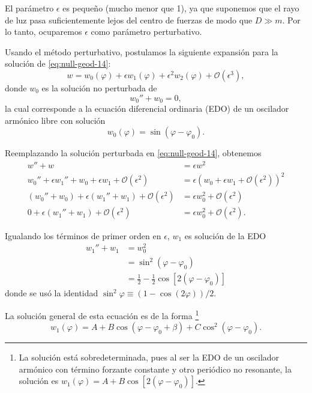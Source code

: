 \documentclass[letterpaper,11pt]{article}
\begin{document}
El parámetro $\epsilon$ es pequeño (mucho menor que 1), ya que suponemos que el rayo de luz pasa suficientemente lejos del centro de fuerzas  de modo que $D \gg m$. Por lo tanto, ocuparemos $\epsilon$ como parámetro perturbativo. 

Usando el método perturbativo, postulamos la siguiente expansión para la solución de \eqref{eq:null-geod-14}:
\begin{equation}
w = w_0(\varphi) + \epsilon w_1(\varphi) + \epsilon^2 w_2(\varphi) + \mathcal{O}(\epsilon^3),
\end{equation}
donde $w_0$ es la solución no perturbada de
\begin{equation}
w_0'' + w_0 = 0,
\end{equation}
la cual corresponde a la ecuación diferencial ordinaria (EDO) de un oscilador armónico libre con solución
\begin{equation}
w_0(\varphi) = \sin(\varphi - \varphi_0).
\end{equation}

Reemplazando la solución perturbada en \eqref{eq:null-geod-14}, obtenemos 
\begin{align}
w'' + w &= \epsilon w^2 \\
w_0'' + \epsilon w_1'' + w_0 + \epsilon w_1 + \mathcal{O}(\epsilon^2) &= \epsilon \left( w_0 + \epsilon w_1 + \mathcal{O}(\epsilon^2)\right)^2 \\
(w_0'' + w_0) + \epsilon (w_1'' + w_1)+ \mathcal{O}(\epsilon^2) &= \epsilon w_0^2 + \mathcal{O}(\epsilon^2) \\
0 + \epsilon(w_1'' + w_1)+ \mathcal{O}(\epsilon^2) &= \epsilon w_0^2 + \mathcal{O}(\epsilon^2).
\end{align}

Igualando los términos de primer orden en $\epsilon$, $w_1$ es solución de la EDO
\begin{align}
w_1'' + w_1 &= w_0^2 \nonumber \\
&= \sin^2(\varphi - \varphi_0)  \nonumber\\
&= \frac{1}{2} - \frac{1}{2}\cos[2(\varphi - \varphi_0)] \label{eq:EDO-w1}
\end{align}
donde se usó la identidad $\sin^2\varphi \equiv (1 - \cos(2\varphi))/2$.

La solución general de esta ecuación es de la forma \footnote{La solución está sobredeterminada, pues al ser la EDO de un oscilador armónico con término forzante constante y otro periódico no resonante, la solución es $w_1(\varphi) = A + B \cos[2(\varphi - \varphi_0)]$.}
\begin{equation}\label{eq:null-geod-sol-pert}
w_1(\varphi) = A + B \cos(\varphi - \varphi_0 + \beta) + C\cos^2(\varphi - \varphi_0).
\end{equation}
\end{document}
